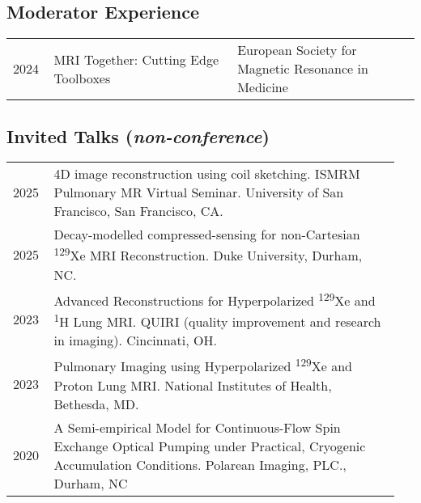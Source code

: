 \documentclass[12pt,]{scrartcl}
\begin{document}
\newpage

\subsection{Moderator Experience}\label{moderator}

\begin{table}[!h]
{\def\arraystretch{1.5}\tabcolsep=0pt
\begin{tabular}{p{0.10\linewidth}p{0.45\linewidth}p{0.45\linewidth}}

2024 & MRI Together: Cutting Edge Toolboxes & European Society for Magnetic Resonance in Medicine \\

\end{tabular}%
}
\end{table}


\subsection{Invited Talks (\textit{non-conference})}\label{presentations-and-talks}

\begin{table}[!h]
{\def\arraystretch{1.5}\tabcolsep=0pt
\begin{tabular}{p{0.10\linewidth}p{0.85\linewidth}}

    2025 & 4D image reconstruction using coil sketching. ISMRM Pulmonary MR Virtual Seminar. University of San Francisco, San Francisco, CA. \\

    2025 & Decay-modelled compressed-sensing for non-Cartesian \textsuperscript{129}Xe MRI Reconstruction. Duke University, Durham, NC. \\
  
  2023 & Advanced Reconstructions for Hyperpolarized \textsuperscript{129}Xe and \textsuperscript{1}H Lung MRI. QUIRI (quality improvement and research in imaging). Cincinnati, OH. \\

  2023 & Pulmonary Imaging using Hyperpolarized \textsuperscript{129}Xe and Proton Lung MRI. National Institutes of Health, Bethesda, MD. \\

  2020 & A Semi-empirical Model for Continuous-Flow Spin Exchange Optical Pumping under Practical, Cryogenic Accumulation Conditions. Polarean Imaging, PLC., Durham, NC \\

    
  
\end{tabular}%
}
\end{table}
\end{document}
